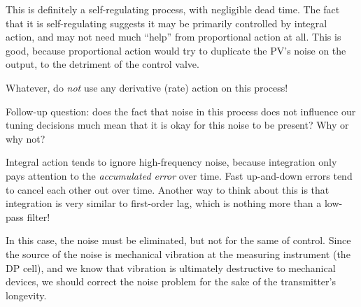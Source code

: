 





This is definitely a self-regulating process, with negligible dead time.  The fact that it is self-regulating suggests it may be primarily controlled by integral action, and may not need much ``help'' from proportional action at all.  This is good, because proportional action would try to duplicate the PV's noise on the output, to the detriment of the control valve.

Whatever, do {\it not} use any derivative (rate) action on this process!

\vskip 10pt

Follow-up question: does the fact that noise in this process does not influence our tuning decisions much mean that it is okay for this noise to be present?  Why or why not?







Integral action tends to ignore high-frequency noise, because integration only pays attention to the {\it accumulated error} over time.  Fast up-and-down errors tend to cancel each other out over time.  Another way to think about this is that integration is very similar to first-order lag, which is nothing more than a low-pass filter!

In this case, the noise must be eliminated, but not for the same of control.  Since the source of the noise is mechanical vibration at the measuring instrument (the DP cell), and we know that vibration is ultimately destructive to mechanical devices, we should correct the noise problem for the sake of the transmitter's longevity.




